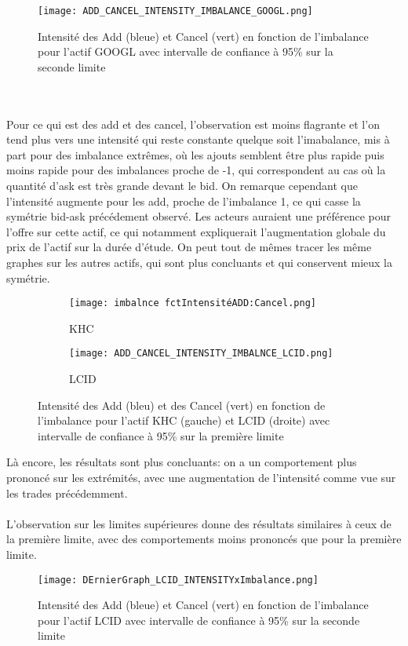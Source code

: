 \documentclass[12pt,a4paper]{article}
\theoremstyle{definition}
\theoremstyle{remark}
\begin{document}
\begin{figure}[h!]
    \centering
    \texttt{[image: ADD\_CANCEL\_INTENSITY\_IMBALANCE\_GOOGL.png]}
    \caption{Intensité des Add (bleue) et Cancel (vert) en fonction de l'imbalance pour l'actif GOOGL avec intervalle de confiance à 95\% sur la seconde limite}
    \label{fig:trades}
\end{figure}
\\
\\
Pour ce qui est des add et des cancel, l'observation est moins flagrante et l'on tend plus vers une intensité qui reste constante quelque soit l'imabalance, mis à part pour des imbalance extrêmes, où les ajouts semblent être plus rapide puis moins rapide pour des imbalances proche de -1, qui correspondent au cas où la quantité d'ask est très grande devant le bid. On remarque cependant que l'intensité augmente pour les add, proche de l'imbalance 1, ce qui casse la symétrie bid-ask précédement observé. Les acteurs auraient une préférence pour l'offre sur cette actif, ce qui notamment expliquerait l'augmentation globale du prix de l'actif sur la durée d'étude. On peut tout de mêmes tracer les même graphes sur les autres actifs, qui sont plus concluants et qui conservent mieux la symétrie.
\begin{figure}[h!]
    \centering
    \begin{subfigure}[b]{0.48\textwidth}
        \centering
        \texttt{[image: imbalnce fctIntensitéADD:Cancel.png]}
        \caption{KHC}
        \label{fig:imbalance}
    \end{subfigure}
    \hfill
    \begin{subfigure}[b]{0.48\textwidth}
        \centering
        \texttt{[image: ADD\_CANCEL\_INTENSITY\_IMBALNCE\_LCID.png]}
        \caption{LCID}
        \label{fig:densite_imbalance}
    \end{subfigure}
    \caption{Intensité des Add (bleu) et des Cancel (vert) en fonction de l'imbalance pour l'actif KHC (gauche) et LCID (droite) avec intervalle de confiance à 95\% sur la première limite}
    \label{fig:comparison}
\end{figure}
Là encore, les résultats sont plus concluants: on a un comportement plus prononcé sur les extrémités, avec une augmentation de l'intensité comme vue sur les trades précédemment.
\\
\\
L'observation sur les limites supérieures donne des résultats similaires à ceux de la première limite, avec des comportements moins prononcés que pour la première limite.
\begin{figure}[h!]
    \centering
    \texttt{[image: DErnierGraph\_LCID\_INTENSITYxImbalance.png]}
    \caption{Intensité des Add (bleue) et Cancel (vert) en fonction de l'imbalance pour l'actif LCID avec intervalle de confiance à 95\% sur la seconde limite}
    \label{fig:trades}
\end{figure}
\end{document}
